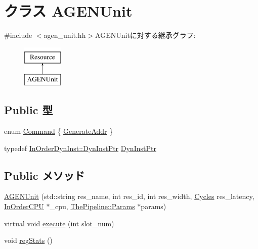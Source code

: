 \hypertarget{classAGENUnit}{
\section{クラス AGENUnit}
\label{classAGENUnit}
}


{\ttfamily \#include $<$agen\_\-unit.hh$>$}AGENUnitに対する継承グラフ:\begin{figure}[H]
\begin{center}
\leavevmode
\includegraphics[height=2cm]{classAGENUnit}
\end{center}
\end{figure}
\subsection*{Public 型}
\begin{DoxyCompactItemize}
\item 
enum \hyperlink{classAGENUnit_a2afce0a47a93eee73a314d53e4890153}{Command} \{ \hyperlink{classAGENUnit_a2afce0a47a93eee73a314d53e4890153a33308417f8eb8f4e3673faee9003d120}{GenerateAddr}
 \}
\item 
typedef \hyperlink{classRefCountingPtr}{InOrderDynInst::DynInstPtr} \hyperlink{classAGENUnit_a32d1573770d3d1d96a1741ac80433e33}{DynInstPtr}
\end{DoxyCompactItemize}
\subsection*{Public メソッド}
\begin{DoxyCompactItemize}
\item 
\hyperlink{classAGENUnit_ad1527407cd4794ebff63afeb1e801999}{AGENUnit} (std::string res\_\-name, int res\_\-id, int res\_\-width, \hyperlink{classCycles}{Cycles} res\_\-latency, \hyperlink{classInOrderCPU}{InOrderCPU} $\ast$\_\-cpu, \hyperlink{namespaceThePipeline_ab62ca16eeca26566ad2422b5df4943ce}{ThePipeline::Params} $\ast$params)
\item 
virtual void \hyperlink{classAGENUnit_a7b7fff82f8c9cbdb02add1346f60bb9e}{execute} (int slot\_\-num)
\item 
void \hyperlink{classAGENUnit_a4dc637449366fcdfc4e764cdf12d9b11}{regStats} ()
\end{DoxyCompactItemize}
